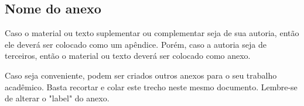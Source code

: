 \begin{anexosenv}

\chapter{Nome do anexo}     %
\label{chap:anexoA}

Caso o material ou texto suplementar ou complementar seja de sua autoria, então ele deverá ser colocado como um apêndice. Porém, caso a autoria seja de terceiros, então o material ou texto deverá ser colocado como anexo.

Caso seja conveniente, podem ser criados outros anexos para o seu trabalho acadêmico. Basta recortar e colar este trecho neste mesmo documento. Lembre-se de alterar o "label"{} do anexo.


\end{anexosenv}
